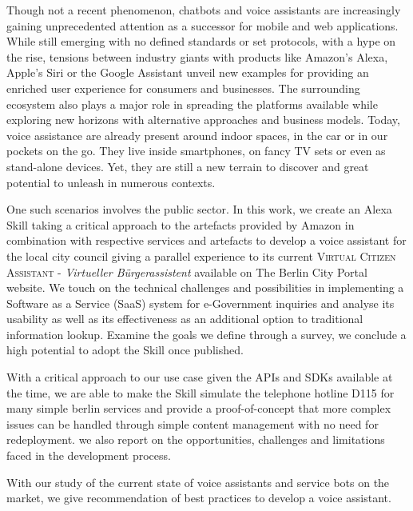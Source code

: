 Though not a recent phenomenon, chatbots and voice assistants are increasingly gaining unprecedented attention as a successor for mobile and web applications. While still emerging with no defined standards or set protocols, with a hype on the rise, tensions between industry giants with products like Amazon's Alexa, Apple's Siri or the Google Assistant %
unveil new examples for providing an enriched user experience for consumers and businesses. The surrounding ecosystem also plays a major role in spreading the platforms available while exploring new horizons with alternative approaches and business models. Today, voice assistance are already present around indoor spaces, in the car or in our pockets on the go. 
They live inside smartphones, on fancy TV sets or even as stand-alone devices. Yet, they are still a new terrain to discover and great potential to unleash in numerous contexts. 

One such scenarios involves the public sector. In this work, we create an Alexa Skill taking a critical approach to the artefacts provided by Amazon in combination with respective services and artefacts to develop a voice assistant for the local city council 
giving a parallel experience to its current \textsc{Virtual Citizen Assistant} - \textit{Virtueller Bürgerassistent} %
available on %
The Berlin City Portal website. We touch on the technical challenges and possibilities in implementing a Software as a Service (SaaS) system for e-Government inquiries and analyse its usability as well as its effectiveness as an additional option to traditional information lookup. Examine the goals we define through a survey, we conclude a high potential to adopt the Skill once published.

With a critical approach to our use case %
given the APIs and SDKs available at the time, we are able to make the Skill simulate the telephone hotline D115 for many simple berlin services and provide a proof-of-concept that more complex issues can be handled through simple content management with no need for redeployment. %
we also report on the opportunities, challenges and limitations faced in the development process.

With our study of the current state of voice assistants and service bots on the market, we give recommendation of best practices to develop a voice assistant. %



